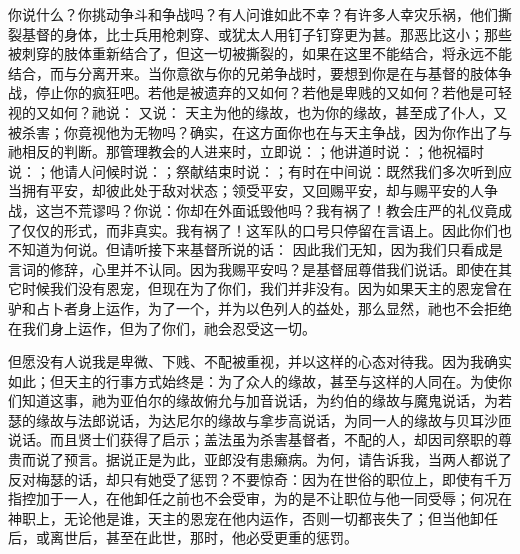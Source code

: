 你说什么？你挑动争斗和争战吗？有人问谁如此不幸？有许多人幸灾乐祸，他们撕裂基督的身体，比士兵用枪刺穿、或犹太人用钉子钉穿更为甚。那恶比这小；那些被刺穿的肢体重新结合了，但这一切被撕裂的，如果在这里不能结合，将永远不能结合，而与分离开来。当你意欲与你的兄弟争战时，要想到你是在与基督的肢体争战，停止你的疯狂吧。若他是被遗弃的又如何？若他是卑贱的又如何？若他是可轻视的又如何？祂说： 又说： 天主为他的缘故，也为你的缘故，甚至成了仆人，又被杀害；你竟视他为无物吗？确实，在这方面你也在与天主争战，因为你作出了与祂相反的判断。那管理教会的人进来时，立即说：；他讲道时说：；他祝福时说：；他请人问候时说：；祭献结束时说：；有时在中间说：既然我们多次听到应当拥有平安，却彼此处于敌对状态；领受平安，又回赐平安，却与赐平安的人争战，这岂不荒谬吗？你说：你却在外面诋毁他吗？我有祸了！教会庄严的礼仪竟成了仅仅的形式，而非真实。我有祸了！这军队的口号只停留在言语上。因此你们也不知道为何说。但请听接下来基督所说的话： 因此我们无知，因为我们只看成是言词的修辞，心里并不认同。因为我赐平安吗？是基督屈尊借我们说话。即使在其它时候我们没有恩宠，但现在为了你们，我们并非没有。因为如果天主的恩宠曾在驴和占卜者身上运作，为了一个，并为以色列人的益处，那么显然，祂也不会拒绝在我们身上运作，但为了你们，祂会忍受这一切。\par

但愿没有人说我是卑微、下贱、不配被重视，并以这样的心态对待我。因为我确实如此；但天主的行事方式始终是：为了众人的缘故，甚至与这样的人同在。为使你们知道这事，祂为亚伯尔的缘故俯允与加音说话，为约伯的缘故与魔鬼说话，为若瑟的缘故与法郎说话，为达尼尔的缘故与拿步高说话，为同一人的缘故与贝耳沙匝说话。而且贤士们获得了启示；盖法虽为杀害基督者，不配的人，却因司祭职的尊贵而说了预言。据说正是为此，亚郎没有患癞病。为何，请告诉我，当两人都说了反对梅瑟的话，却只有她受了惩罚？不要惊奇：因为在世俗的职位上，即使有千万指控加于一人，在他卸任之前也不会受审，为的是不让职位与他一同受辱；何况在神职上，无论他是谁，天主的恩宠在他内运作，否则一切都丧失了；但当他卸任后，或离世后，甚至在此世，那时，他必受更重的惩罚。\par

